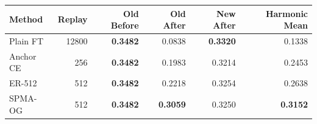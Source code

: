 \begin{tabular}{lrrrrr}
\toprule
Method & Replay & Old Before & Old After & New After & Harmonic Mean\\
\midrule
Plain FT & 12800 & \textbf{0.3482} & 0.0838 & \textbf{0.3320} & 0.1338\\
Anchor CE & 256 & \textbf{0.3482} & 0.1983 & 0.3214 & 0.2453\\
ER-512 & 512 & \textbf{0.3482} & 0.2218 & 0.3254 & 0.2638\\
SPMA-OG & 512 & \textbf{0.3482} & \textbf{0.3059} & 0.3250 & \textbf{0.3152}\\
\bottomrule
\end{tabular}
